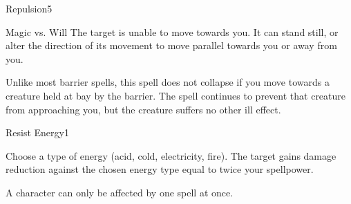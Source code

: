 \begin{spellsection}{Repulsion}{5}
    \begin{spellheader}
    \end{spellheader}
    \begin{spellcontent}
        \begin{spelltargetinginfo}
        \end{spelltargetinginfo}
        \begin{spelleffects}
            \begin{spellattack}{Magic vs. Will}
                \spellsuccess The target is unable to move towards you. It can stand still, or alter the direction of its movement to move parallel towards you or away from you.
            \end{spellattack}
            \spelldur \durshort \dismissable
        \end{spelleffects}
    \end{spellcontent}
    \begin{spellfooter}
        \spellnotes Unlike most barrier spells, this spell does not collapse if you move towards a creature held at bay by the barrier. The spell continues to prevent that creature from approaching you, but the creature suffers no other ill effect.
        \miscastexplode
    \end{spellfooter}
\end{spellsection}

\begin{spellsection}{Resist Energy}{1}
    \begin{spellheader}
    \end{spellheader}
    \begin{spellcontent}
        \begin{spelltargetinginfo}
        \end{spelltargetinginfo}
        \begin{spelleffects}
            \spellspecial Choose a type of energy (acid, cold, electricity, fire).
            \spelleffect The target gains damage reduction against the chosen energy type equal to twice your spellpower.
            \spelldur \durpersonallong
        \end{spelleffects}
    \end{spellcontent}
    \begin{spellfooter}
        \spellnotes A character can only be affected by one  spell at once.
        \miscastexplode
    \end{spellfooter}
\end{spellsection}

